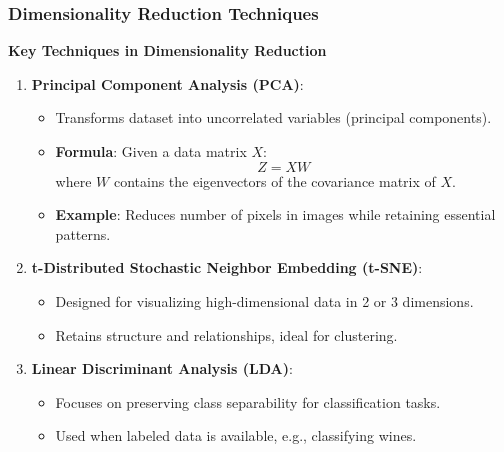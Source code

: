 \documentclass[aspectratio=169]{beamer}
\begin{document}
\begin{frame}[fragile]
    \frametitle{Dimensionality Reduction Techniques}
    \textbf{Key Techniques in Dimensionality Reduction}
    \begin{enumerate}
        \item \textbf{Principal Component Analysis (PCA)}:
        \begin{itemize}
            \item Transforms dataset into uncorrelated variables (principal components).
            \item \textbf{Formula}: Given a data matrix \(X\):
            \begin{equation}
                Z = XW
            \end{equation}
            where \(W\) contains the eigenvectors of the covariance matrix of \(X\).
            \item \textbf{Example}: Reduces number of pixels in images while retaining essential patterns.
        \end{itemize}
        
        \item \textbf{t-Distributed Stochastic Neighbor Embedding (t-SNE)}:
        \begin{itemize}
            \item Designed for visualizing high-dimensional data in 2 or 3 dimensions.
            \item Retains structure and relationships, ideal for clustering.
        \end{itemize}
        
        \item \textbf{Linear Discriminant Analysis (LDA)}:
        \begin{itemize}
            \item Focuses on preserving class separability for classification tasks.
            \item Used when labeled data is available, e.g., classifying wines.
        \end{itemize}
    \end{enumerate}
\end{frame}
\end{document}
